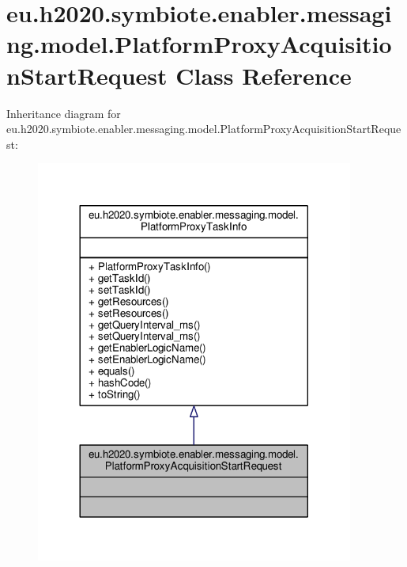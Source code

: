 \hypertarget{classeu_1_1h2020_1_1symbiote_1_1enabler_1_1messaging_1_1model_1_1PlatformProxyAcquisitionStartRequest}{}\section{eu.\+h2020.\+symbiote.\+enabler.\+messaging.\+model.\+Platform\+Proxy\+Acquisition\+Start\+Request Class Reference}
\label{classeu_1_1h2020_1_1symbiote_1_1enabler_1_1messaging_1_1model_1_1PlatformProxyAcquisitionStartRequest}


Inheritance diagram for eu.\+h2020.\+symbiote.\+enabler.\+messaging.\+model.\+Platform\+Proxy\+Acquisition\+Start\+Request\+:\nopagebreak
\begin{figure}[H]
\begin{center}
\leavevmode
\includegraphics[width=296pt]{classeu_1_1h2020_1_1symbiote_1_1enabler_1_1messaging_1_1model_1_1PlatformProxyAcquisitionStartRequest__inherit__graph}
\end{center}
\end{figure}


